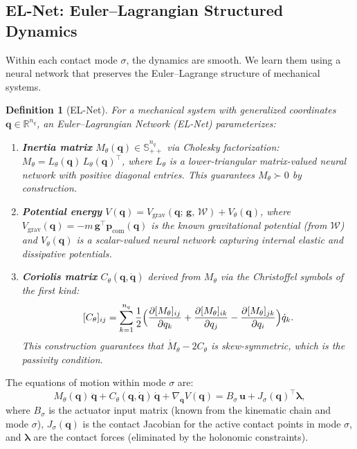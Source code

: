 \documentclass[letterpaper, 10pt, conference]{IEEEtran}
\newtheorem{definition}{Definition}
\newcommand{\R}{\mathbb{R}}
\newcommand{\Spp}{\mathbb{S}_{++}}
\newcommand{\bu}{\bm{u}}
\newcommand{\bq}{\bm{q}}
\newcommand{\bp}{\bm{p}}
\newcommand{\cW}{\mathcal{W}}
\begin{document}
\subsection{EL-Net: Euler--Lagrangian Structured Dynamics}
\label{sec:elnet}

Within each contact mode $\sigma$, the dynamics are smooth.
We learn them using a neural network that preserves the
Euler--Lagrange structure of mechanical systems.

\begin{definition}[EL-Net]\label{def:elnet}
For a mechanical system with generalized coordinates
$\bq \in \R^{n_q}$, an \emph{Euler--Lagrangian Network}
(EL-Net) parameterizes:
\begin{enumerate}
  \item \textbf{Inertia matrix}
    $M_\theta(\bq) \in \Spp^{n_q}$
    via Cholesky factorization:
    $M_\theta = L_\theta(\bq) \, L_\theta(\bq)^\top$,
    where $L_\theta$ is a lower-triangular matrix-valued
    neural network with positive diagonal entries.
    This guarantees $M_\theta \succ 0$ by construction.
  \item \textbf{Potential energy}
    $V(\bq) = V_{\mathrm{grav}}(\bq;\, \bm{g},\, \cW)
              + V_\theta(\bq)$,
    where $V_{\mathrm{grav}}(\bq) = -m \, \bm{g}^\top
    \bp_{\mathrm{com}}(\bq)$
    is the known gravitational potential (from $\cW$)
    and $V_\theta(\bq)$ is a scalar-valued neural network
    capturing internal elastic and dissipative potentials.
  \item \textbf{Coriolis matrix}
    $C_\theta(\bq, \dot{\bq})$ derived from $M_\theta$ via
    the Christoffel symbols of the first kind:
    \begin{equation}\label{eq:christoffel}
      [C_\theta]_{ij}
      = \sum_{k=1}^{n_q} \frac{1}{2}
        \Bigl(
          \frac{\partial [M_\theta]_{ij}}{\partial q_k}
          + \frac{\partial [M_\theta]_{ik}}{\partial q_j}
          - \frac{\partial [M_\theta]_{jk}}{\partial q_i}
        \Bigr) \dot{q}_k.
    \end{equation}
    This construction guarantees that
    $\dot{M}_\theta - 2 C_\theta$ is skew-symmetric,
    which is the passivity condition.
\end{enumerate}
\end{definition}

The equations of motion within mode $\sigma$ are:
\begin{equation}\label{eq:eom}
  M_\theta(\bq) \, \ddot{\bq}
  + C_\theta(\bq, \dot{\bq}) \, \dot{\bq}
  + \nabla_{\bq} V(\bq)
  = B_\sigma \, \bu
  + J_\sigma(\bq)^\top \bm{\lambda},
\end{equation}
where $B_\sigma$ is the actuator input matrix
(known from the kinematic chain and mode $\sigma$),
$J_\sigma(\bq)$ is the contact Jacobian for the active
contact points in mode $\sigma$,
and $\bm{\lambda}$ are the contact forces
(eliminated by the holonomic constraints).
\end{document}
